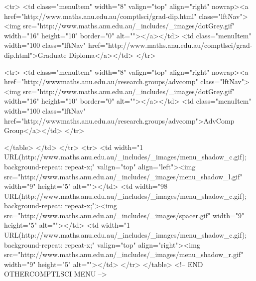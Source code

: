 \begin{html}
    <tr>
    <td class="menuItem" width="8"
    valign="top" align="right" nowrap><a
    href="http://www.maths.anu.edu.au/comptlsci/grad-dip.html"
    class="lftNav"><img src="http://www.maths.anu.edu.au/_includes/_images/dotGrey.gif" width="16"
    height="10" border="0" alt=""></a></td>
    <td class="menuItem" width="100%
    class="lftNav"
    href="http://www.maths.anu.edu.au/comptlsci/grad-dip.html">Graduate Diploma</a></td>
  </tr>

  <tr>
    <td class="menuItem" width="8"
    valign="top" align="right" nowrap><a
    href="http://wwwmaths.anu.edu.au/research.groups/advcomp"
    class="lftNav"><img src="http://www.maths.anu.edu.au/_includes/_images/dotGrey.gif" width="16"
    height="10" border="0" alt=""></a></td>
    <td class="menuItem" width="100%
    class="lftNav"
    href="http://wwwmaths.anu.edu.au/research.groups/advcomp">AdvComp Group</a></td>
  </tr>



  </table>
  </td>
</tr>
<tr>
  <td width="1%
  URL(http://www.maths.anu.edu.au/_includes/_images/menu_shadow_c.gif); background-repeat: repeat-x;"
  valign="top" align="left"><img src="http://www.maths.anu.edu.au/_includes/_images/menu_shadow_l.gif"
  width="9" height="5" alt=""></td>
  <td width="98%
  URL(http://www.maths.anu.edu.au/_includes/_images/menu_shadow_c.gif); background-repeat:
  repeat-x;"><img src="http://www.maths.anu.edu.au/_includes/_images/spacer.gif" width="9" height="5"
  alt=""></td>
  <td width="1%
  URL(http://www.maths.anu.edu.au/_includes/_images/menu_shadow_c.gif); background-repeat: repeat-x;"
  valign="top" align="right"><img src="http://www.maths.anu.edu.au/_includes/_images/menu_shadow_r.gif"
  width="9" height="5" alt=""></td>
</tr>
</table>
<!-- END OTHERCOMPTLSCI MENU -->



\end{html}
